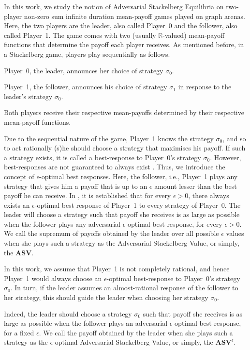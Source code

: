 In this work, we study the notion of Adversarial Stackelberg Equilibria on two-player non-zero sum infinite duration mean-payoff games played on graph arenas. Here, the two players are the leader, also called Player~0 and the follower, also called Player~1. The game comes with two (usually $\mathbb{R}$-valued) mean-payoff functions that determine the payoff each player receives. As mentioned before, in a Stackelberg game, players play sequentially as follows.
\begin{inparaenum}[(i)]
\item Player~0, the leader, announces her choice of strategy $\sigma_0$. 
\item Player~1, the follower, announces his choice of strategy $\sigma_1$ in response to the leader's strategy $\sigma_0$. 
\item Both players receive their respective mean-payoffs determined by their respective mean-payoff functions.
\end{inparaenum}
Due to the sequential nature of the game, Player~1 knows the strategy $\sigma_0$, and so to act rationally (s)he should choose a strategy that maximises his payoff. If such a strategy exists, it is called a best-response to Player~0's strategy $\sigma_0$. However, best-responses are not guaranteed to always exist \cite{FGR20}. Thus, we introduce the concept of $\epsilon$-optimal best responses. Here, the follower, i.e., Player~1  plays any strategy that gives him a payoff that is up to an $\epsilon$ amount lesser than the best payoff he can receive. In \cite{FGR20}, it is  established that for every $\epsilon > 0$, there always exists an $\epsilon$-optimal best response of Player~1 to every strategy of Player~0. The leader will choose a strategy such that payoff she receives is as large as possible when the follower plays any adversarial $\epsilon$-optimal best response, for every $\epsilon > 0$. We call the supremum of payoffs obtained by the leader over all possible $\epsilon$ values when she plays such a strategy as the Adversarial Stackelberg Value, or simply, the $\mathbf{ASV}$.

In this work, we assume that Player~1 is not completely rational, and hence Player~1 would always choose an $\epsilon$-optimal best-response to Player~0's strategy $\sigma_0$.
In turn, if the leader assumes an almost-rational response of the follower to her strategy, this should guide the leader when choosing her strategy $\sigma_0$.

Indeed, the leader should choose a strategy $\sigma_0 $ such that payoff she receives is as large as possible when the follower plays an adversarial $\epsilon$-optimal best-response, for a fixed $\epsilon$. We call the payoff obtained by the leader when she plays such a strategy as the $\epsilon$-optimal Adversarial Stackelberg Value, or simply, the $\mathbf{ASV}^{\epsilon}$.


